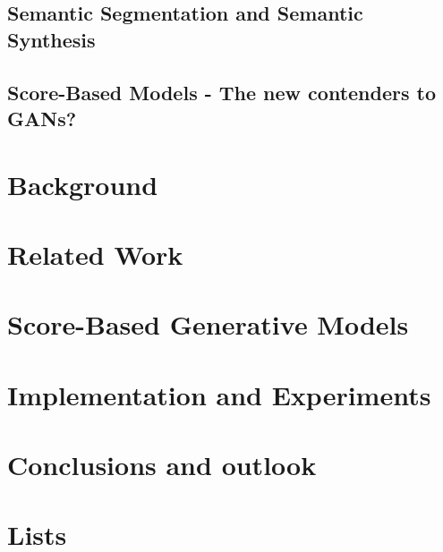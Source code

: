 \documentclass[a4paper, 12pt, oneside]{scrbook}
\begin{document}
\section{Semantic Segmentation and Semantic Synthesis} %
\section{Score-Based Models - The new contenders to GANs?} %

\chapter{Background}





\chapter{Related Work}



\chapter{Score-Based Generative Models} %





\chapter{Implementation and Experiments}



\chapter{Conclusions and outlook} %
\appendix 
\chapter{Lists}
\listoffigures
\listoftables

\listofalgorithms


\end{document}
